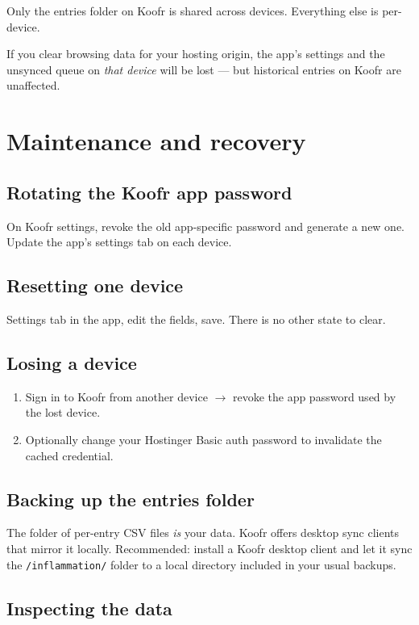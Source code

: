 \documentclass[11pt,a4paper]{article}
\begin{document}
Only the entries folder on Koofr is shared across devices. Everything else is per-device.

If you clear browsing data for your hosting origin, the app's settings and the unsynced queue on \emph{that device} will be lost --- but historical entries on Koofr are unaffected.

\section{Maintenance and recovery}

\subsection{Rotating the Koofr app password}
On Koofr settings, revoke the old app-specific password and generate a new one. Update the app's settings tab on each device.

\subsection{Resetting one device}
Settings tab in the app, edit the fields, save. There is no other state to clear.

\subsection{Losing a device}
\begin{enumerate}[leftmargin=*,nosep]
  \item Sign in to Koofr from another device $\rightarrow$ revoke the app password used by the lost device.
  \item Optionally change your Hostinger Basic auth password to invalidate the cached credential.
\end{enumerate}

\subsection{Backing up the entries folder}
The folder of per-entry CSV files \emph{is} your data. Koofr offers desktop sync clients that mirror it locally. Recommended: install a Koofr desktop client and let it sync the \texttt{/inflammation/} folder to a local directory included in your usual backups.

\subsection{Inspecting the data}
\end{document}
